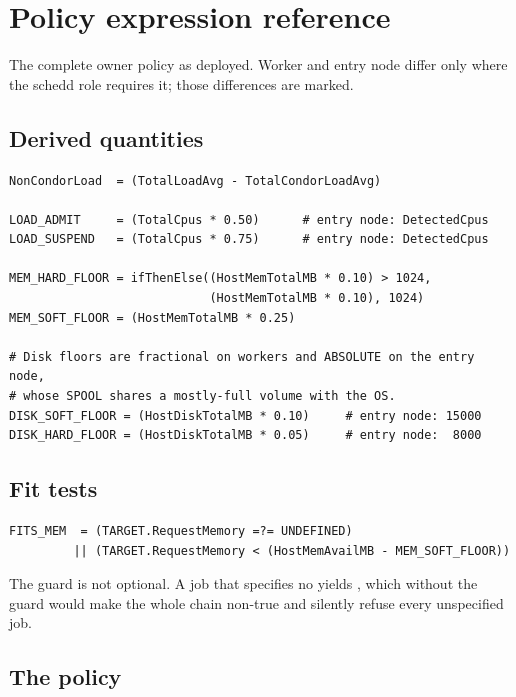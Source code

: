 \section{Policy expression reference}
\label{app:policy}

The complete owner policy as deployed. Worker and entry node differ only where
the schedd role requires it; those differences are marked.

\subsection{Derived quantities}

\begin{lstlisting}
NonCondorLoad  = (TotalLoadAvg - TotalCondorLoadAvg)

LOAD_ADMIT     = (TotalCpus * 0.50)      # entry node: DetectedCpus
LOAD_SUSPEND   = (TotalCpus * 0.75)      # entry node: DetectedCpus

MEM_HARD_FLOOR = ifThenElse((HostMemTotalMB * 0.10) > 1024,
                            (HostMemTotalMB * 0.10), 1024)
MEM_SOFT_FLOOR = (HostMemTotalMB * 0.25)

# Disk floors are fractional on workers and ABSOLUTE on the entry node,
# whose SPOOL shares a mostly-full volume with the OS.
DISK_SOFT_FLOOR = (HostDiskTotalMB * 0.10)     # entry node: 15000
DISK_HARD_FLOOR = (HostDiskTotalMB * 0.05)     # entry node:  8000
\end{lstlisting}

\subsection{Fit tests}

\begin{lstlisting}
FITS_MEM  = (TARGET.RequestMemory =?= UNDEFINED)
         || (TARGET.RequestMemory < (HostMemAvailMB - MEM_SOFT_FLOOR))
\end{lstlisting}

The  guard is not optional. A job that specifies no
 yields , which without the guard would make
the whole \kn{\&\&} chain non-true and silently refuse every unspecified job.

\subsection{The policy}

